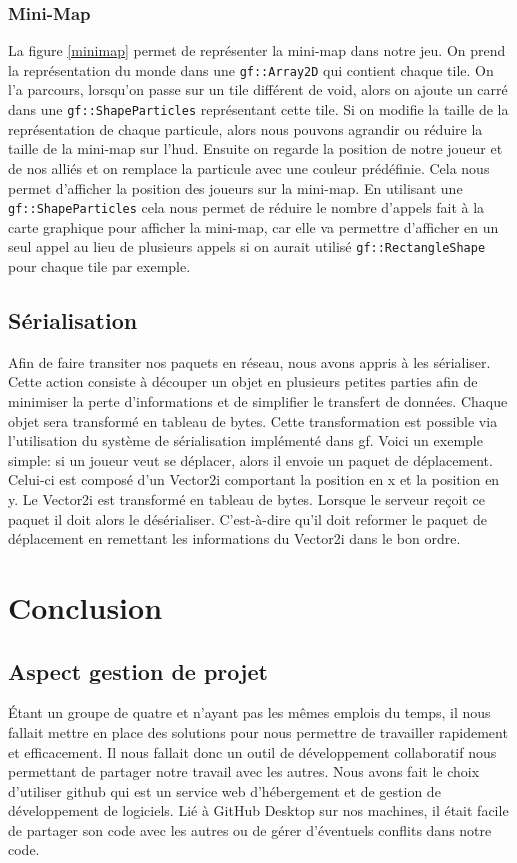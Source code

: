 \documentclass[a4paper, 12pt, twoside]{article}
\begin{document}
\subsubsection{Mini-Map}
La figure \ref{minimap} permet de représenter la mini-map dans notre jeu. On prend la représentation du monde dans une \verb!gf::Array2D! qui contient chaque tile. On l'a parcours, lorsqu'on passe sur un tile différent de void, alors on ajoute un carré dans une \verb!gf::ShapeParticles! représentant cette tile. Si on modifie la taille de la représentation de chaque particule, alors nous pouvons agrandir ou réduire la taille de la mini-map sur l'hud. Ensuite on regarde la position de notre joueur et de nos alliés et on remplace la particule avec une couleur prédéfinie. Cela nous permet d'afficher la position des joueurs sur la mini-map. En utilisant une \verb!gf::ShapeParticles! cela nous permet de réduire le nombre d'appels fait à la carte graphique pour afficher la mini-map, car elle va permettre d'afficher en un seul appel au lieu de plusieurs appels si on aurait utilisé \verb!gf::RectangleShape! pour chaque tile par exemple.

\subsection{Sérialisation}
Afin de faire transiter nos paquets en réseau, nous avons appris à les sérialiser. Cette action consiste à découper un objet en plusieurs petites parties afin de minimiser la perte d'informations et de simplifier le transfert de données. Chaque objet sera transformé en tableau de bytes. Cette transformation est possible via l'utilisation  du système de sérialisation  implémenté dans gf. Voici un exemple simple: si un joueur veut se déplacer, alors il envoie un paquet de déplacement. Celui-ci est composé d'un Vector2i comportant la position en x et la position en y. Le Vector2i est transformé en tableau de bytes. Lorsque le serveur reçoit ce paquet il doit alors le désérialiser. C'est-à-dire qu'il doit reformer le paquet de déplacement en remettant les informations du Vector2i dans le bon ordre.
\newpage
\section{Conclusion}

\subsection{Aspect gestion de projet}
Étant un groupe de quatre et n'ayant pas les mêmes emplois du temps, il nous fallait
mettre en place des solutions pour nous permettre de travailler rapidement et
efficacement. Il nous fallait donc un outil de développement collaboratif nous
permettant de partager notre travail avec les autres. Nous avons fait le choix
d’utiliser github qui est un service web d’hébergement et de gestion de
développement de logiciels. Lié à GitHub Desktop sur nos machines, il était
facile de partager son code avec les autres ou de gérer d’éventuels conflits dans
notre code.\par
\end{document}
